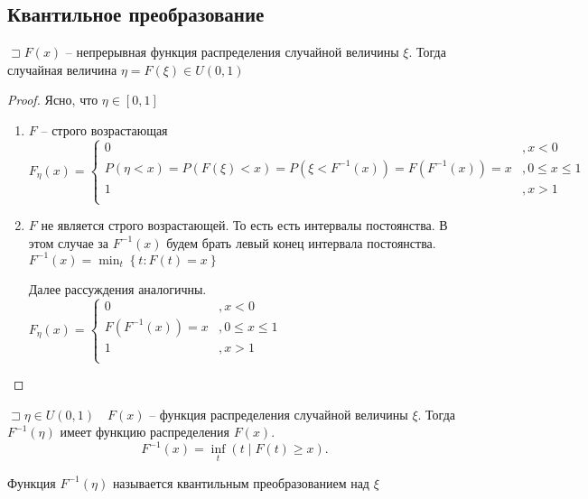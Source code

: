 \subsection{Квантильное преобразование}

\begin{theorem}
    $\sqsupset F(x)$ -- непрерывная функция распределения случайной величины $\xi$. Тогда случайная величина $\eta = F\left( \xi \right) \in U\left( 0,1 \right) $
\end{theorem}
\begin{proof}
    Ясно, что $\eta\in [0,1]$

    \begin{enumerate}
        \item $F$ -- строго возрастающая
        $F_\eta(x) = \begin{cases}
            0&,x < 0\\
            P\left(\eta<x \right) = P\left( F(\xi) <x \right) =P\left( \xi< F^{-1}(x) \right) =F\left( F^{-1}(x) \right) =x  &, 0\leqslant x\leqslant 1\\
            1&, x > 1\\
        \end{cases}$
    \item $F$ не является строго возрастающей. То есть есть интервалы постоянства. В этом случае за  $F^{-1}(x)$ будем брать левый конец интервала постоянства.  $F^{-1}(x) = \min_t\left\{ t: F(t) = x \right\} $ 

        Далее рассуждения аналогичны.
        $F_\eta(x) = \begin{cases}
            0&,x < 0\\
            F\left( F^{-1}(x) \right) =x  &, 0\leqslant x\leqslant 1\\
            1&, x > 1\\
        \end{cases}$
    \end{enumerate}
\end{proof}


\begin{theorem}
    $\sqsupset \eta\in U\left( 0,1 \right) \quad F(x)$ -- функция распределения случайной величины $\xi$. Тогда  $F^{-1}(\eta)$ имеет функцию распределения  $F(x)$. 
    \[
        F^{-1}(x) = \inf_t\left( t\mid F(t) \geqslant x \right) 
    .\] 
\end{theorem}

\begin{definition}
    Функция $F^{-1}\left( \eta \right) $ называется квантильным преобразованием над $\xi$
\end{definition}

